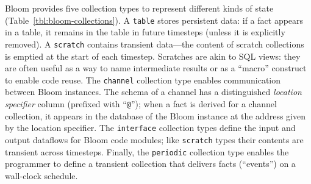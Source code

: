 Bloom provides five collection types to represent different kinds of state
(Table~\ref{tbl:bloom-collections}). A \texttt{table} stores persistent data: if
a fact appears in a table, it remains in the table in future timesteps (unless it
is explicitly removed). A \texttt{scratch} contains transient data---the content
of scratch collections is emptied at the start of each timestep. Scratches are
akin to SQL views: they are often useful as a way to name intermediate results
or as a ``macro'' construct to enable code reuse. The \texttt{channel}
collection type enables communication between Bloom instances. The schema of a
channel has a distinguished \emph{location specifier} column (prefixed with
``\texttt{@}''); when a fact is derived for a channel collection, it appears in
the database of the Bloom instance at the address given by the location
specifier. The \texttt{interface} collection types define the input and output dataflows for Bloom code modules; like \texttt{scratch} types their contents are transient across timesteps.  Finally, the \texttt{periodic} collection type enables the programmer to define a transient collection that delivers facts (``events'') on a wall-clock schedule.

